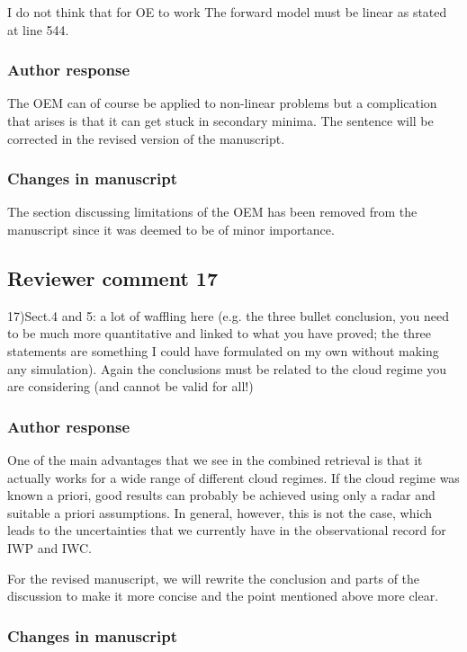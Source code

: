 I do not think that for OE to work The forward model must be linear as stated at line 544.

\subsubsection*{Author response}

The OEM can of course be applied to non-linear problems but a complication that
arises is that it can get stuck in secondary minima. The sentence will be
corrected in the revised version of the manuscript.

\subsubsection*{Changes in manuscript}

The section discussing limitations of the OEM has been removed from the manuscript
since it was deemed to be of minor importance.

\subsection*{Reviewer comment 17}

17)Sect.4 and 5: a lot of waffling here (e.g. the three bullet conclusion, you
need to be much more quantitative and linked to what you have proved; the three
statements are something I could have formulated on my own without making any
simulation). Again the conclusions must be related to the cloud regime you are
considering (and cannot be valid for all!)

\subsubsection*{Author response}

One of the main advantages that we see in the combined retrieval is that it
actually works for a wide range of different cloud regimes. If the cloud regime
was known a priori, good results can probably be achieved using only a radar and
suitable a priori assumptions. In general, however, this is not the case, which
leads to the uncertainties that we currently have in the observational record
for IWP and IWC.

For the revised manuscript, we will rewrite the conclusion and parts of the discussion to make
it more concise and the point mentioned above more clear.

\subsubsection*{Changes in manuscript}


